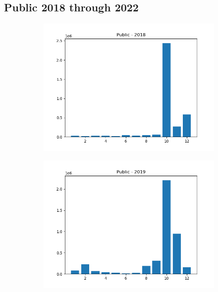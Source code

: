 \documentclass{article}
\begin{document}
\subsection*{Public 2018 through 2022}
\begin{figure}[H]
    \begin{subfigure}{.5\textwidth}
        \centering
        \includegraphics[width=\textwidth]{../../output/figures/annual_source_distribution/Public_data_dist_2018.png}
    \end{subfigure}
    \begin{subfigure}{.5\textwidth}
        \centering
        \includegraphics[width=\textwidth]{../../output/figures/annual_source_distribution/Public_data_dist_2019.png}

\end{subfigure}
\end{figure}
\end{document}
